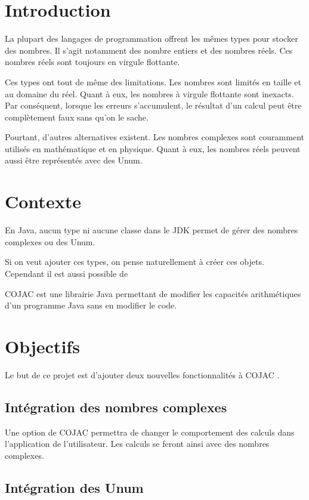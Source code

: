 \section{Introduction}

La plupart des langages de programmation offrent les mêmes types pour stocker des nombres. Il s'agit notamment des nombre entiers et des nombres réels. Ces nombres réels sont toujours en virgule flottante.

Ces types ont tout de même des limitations. Les nombres sont limités en taille et au domaine du réel. Quant à eux, les nombres à virgule flottante sont inexacts. Par conséquent, lorsque les erreurs s'accumulent, le résultat d'un calcul peut être complètement faux sans qu'on le sache.

Pourtant, d'autres alternatives existent. Les nombres complexes sont couramment utilisés en mathématique et en physique. Quant à eux, les nombres réels peuvent aussi être représentés avec des Unum.


\section{Contexte}

En Java, aucun type ni aucune classe dans le JDK permet de gérer des nombres complexes ou des Unum.

Si on veut ajouter ces types, on pense naturellement à créer ces objets. Cependant il est aussi possible de 

COJAC \cite{COJAC} est une librairie Java permettant de modifier les capacités arithmétiques d'un programme Java sans en modifier le code.

\section{Objectifs}

Le but de ce projet est d'ajouter deux nouvelles fonctionnalités à COJAC \cite{COJAC}.

\subsection{Intégration des nombres complexes}

Une option de COJAC permettra de changer le comportement des calculs dans l'application de l'utilisateur. Les calculs se feront ainsi avec des nombres complexes.

\subsection{Intégration des Unum}

